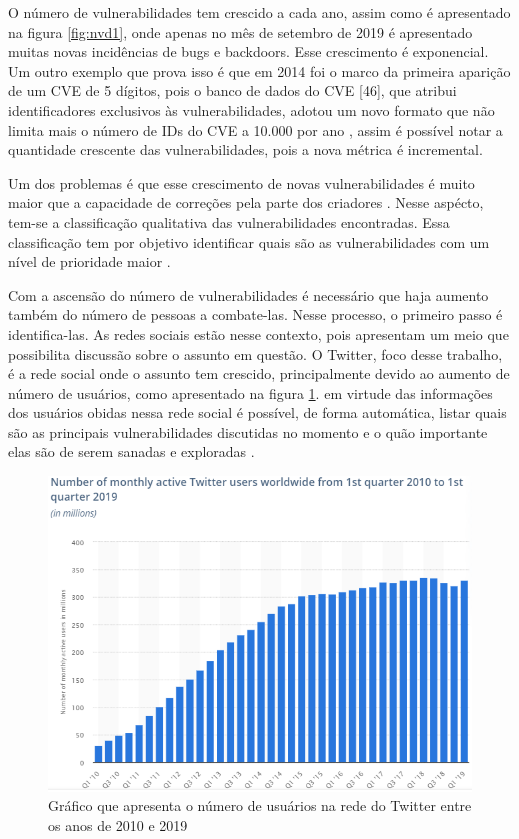 O número de vulnerabilidades tem crescido a cada ano, assim como é apresentado na figura \ref{fig:nvd1}, onde apenas no mês de setembro de 2019 é apresentado muitas novas incidências de bugs e backdoors. Esse crescimento é exponencial. Um outro exemplo que prova isso é que em 2014 foi o marco da primeira aparição de um CVE de 5 dígitos, pois o banco de dados do CVE [46], que atribui identificadores exclusivos às vulnerabilidades, adotou um novo formato que não limita mais o número de IDs do CVE a 10.000 por ano \cite{Sabottke2015}, assim é possível notar a quantidade crescente das vulnerabilidades, pois a nova métrica é incremental.

Um dos problemas é que esse crescimento de novas vulnerabilidades é muito maior que a capacidade de correções pela parte dos criadores \cite{ALVESBATISTA2007}. Nesse aspécto, tem-se a classificação qualitativa das vulnerabilidades encontradas. Essa classificação tem por objetivo identificar quais são as vulnerabilidades com  um nível de prioridade maior \cite{Sabottke2015}.

Com a ascensão do número de vulnerabilidades é necessário que haja aumento também do número de pessoas a combate-las. Nesse processo, o primeiro passo é identifica-las. As redes sociais estão nesse contexto, pois apresentam um meio que possibilita discussão sobre o assunto em questão. O Twitter, foco desse trabalho, é a rede social onde o assunto tem crescido, principalmente devido ao aumento de número de usuários, como apresentado na figura \ref{fig:relacionado_um}. em virtude das informações dos usuários obidas nessa rede social é possível, de forma automática, listar quais são as principais vulnerabilidades discutidas no momento e o quão importante elas são de serem sanadas e exploradas \cite{Correia2016}.

\begin{figure}[H]
\centering
\includegraphics[width=1\textwidth]{imagens/relacionado_um.png}
\caption{Gráfico que apresenta o número de usuários na rede do Twitter entre os anos de 2010 e 2019 \cite{Statista2019}}
\label{fig:relacionado_um}
\end{figure}

